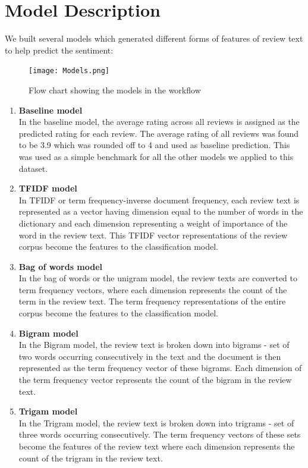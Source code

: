 \documentclass[paper=a4, fontsize=11pt]{scrartcl} %
\numberwithin{equation}{section} %
\numberwithin{figure}{section} %
\numberwithin{table}{section} %
\begin{document}
\section{Model Description}
We built several models which generated different forms of features of review text to help predict the sentiment:

\begin{figure}
\centering
\texttt{[image: Models.png]}
\caption{Flow chart showing the models in the workflow}
\label{models_diag}
\end{figure} 

\begin{enumerate}

\item \textbf{Baseline model}\\
In the baseline model, the average rating across all reviews is assigned as the predicted rating for each review. The average rating of all reviews was found to be 3.9 which was rounded off to 4 and used as baseline prediction. This was used as a simple benchmark for all the other models we applied to this dataset.

\item \textbf{TFIDF model}\\
In TFIDF or term frequency-inverse document frequency, each review text is represented as a vector having dimension equal to the number of words in the dictionary and each dimension representing a weight of importance of the word in the review text. This TFIDF vector representations of the review corpus become the features to the classification model.

\item \textbf{Bag of words model}\\
In the bag of words or the unigram model, the review texts are converted to term frequency vectors, where each dimension represents the count of the term in the review text. The term frequency representations of the entire corpus become the features to the classification model.

\item \textbf{Bigram model}\\
In the Bigram model, the review text is broken down into bigrams - set of two words occurring consecutively in the text and the document is then represented as the term frequency vector of these bigrams. Each dimension of the term frequency vector represents the count of the bigram in the review text. 

\item \textbf{Trigam model}\\
In the Trigram model, the review text is broken down into trigrams - set of three words occurring consecutively. The term frequency vectors of these sets become the features of the review text where each dimension represents the count of the trigram in the review text.


\end{enumerate}
\end{document}
